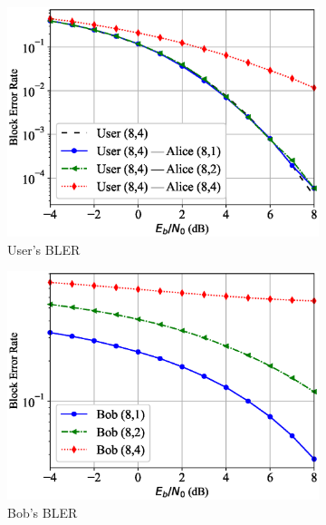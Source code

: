 \begin{figure}[tp!]
	\begin{subfigure}{0.28\textwidth}
		\includegraphics[width=\linewidth]{figs/covert_autoencoder_bler_awgn}
		\caption{User's BLER}
		\label{fig:awgn_resutls_ae}
	\end{subfigure}
	\hspace*{\fill}
	\begin{subfigure}{0.28\textwidth}
		\includegraphics[width=\linewidth]{figs/bob_bler_awgn}
		\caption{Bob's BLER}	
		\label{fig:awgn_resutls_bob}
	\end{subfigure}
	\hspace*{\fill}
	\begin{subfigure}{0.28\textwidth}

\end{subfigure}
\end{figure}
